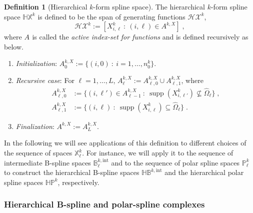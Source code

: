 \documentclass[10pt]{article}
\DeclareMathOperator{\supp}{supp}
\newcommand{\basis}[1]{\mathcal{#1}}
\newcommand{\vSpace}[1]{\mathbb{#1}}
\newcommand{\tpDomain}{\widehat{\Omega}}
\newcommand{\bsp}{B}
\newcommand{\bspS}{\vSpace{\bsp}}
\newcommand{\polar}{P}
\newcommand{\polarS}{\vSpace{\polar}}
\newcommand{\tint}{\mathrm{int}}
\newcommand{\hSpace}[1]{\mathit{\vSpace{H}\vSpace{#1}}}
\newcommand{\hBasis}[1]{\mathit{\basis{H}\basis{#1}}}
\newcommand{\activeS}[2]{A^{#1}_{#2}}
\theoremstyle{plain}
\theoremstyle{definition}
\newtheorem{definition}{Definition}[section]
\theoremstyle{remark}
\begin{document}
\begin{definition}[Hierarchical $k$-form spline space]
    The hierarchical $k$-form spline space $\hSpace{X}^k$ is defined to be the span of generating functions $\hBasis{X}^k$,
    \begin{equation}
        \hBasis{X}^k := \left[
            X_{i,\ell}^k~:~(i,\ell) \in \activeS{k,X}{}
        \right]\;,
    \end{equation}
    where $\activeS{}{}$ is called the \emph{active index-set for functions} and is defined recursively as below.
    \begin{enumerate}
        \item \emph{Initialization}: $\activeS{k,X}{0} := \{(i,0)~:~i = 1, \dots, n^k_0\}$.
        \item \emph{Recursive case}: For $\ell = 1,\dots,L$, $\activeS{k,X}{\ell} := \activeS{k,X}{\ell,0} \cup \activeS{k,X}{\ell,1}$, where
            \begin{equation}
                \begin{split}
                    \activeS{k,X}{\ell,0} &:= \{(i,\ell') \in \activeS{k,X}{\ell-1}~:~ \supp(X^k_{i,\ell'}) \not\subseteq \tpDomain_{\ell}\}\;,\\
                    \activeS{k,X}{\ell,1} &:= \{(i,\ell)~:~ \supp(X^k_{i,\ell}) \subseteq \tpDomain_{\ell}\}\;.
                \end{split}
            \end{equation}
        \item \emph{Finalization}: $\activeS{k,X}{} := \activeS{k,X}{L}$.
    \end{enumerate}
\end{definition}
In the following we will see applications of this definition to different choices of the sequence of spaces $\vSpace{X}^k_\ell$.
For instance, we will apply it to the sequence of intermediate B-spline spaces $\bspS^{k,\tint}_\ell$ and to the sequence of polar spline spaces $\polarS^k_\ell$ to construct the hierarchical B-spline spaces $\hSpace{\bsp}^{k,\tint}$ and the hierarchical polar spline spaces $\hSpace{\polar}^k$, respectively.

\subsubsection{Hierarchical B-spline and polar-spline complexes}
\label{sec:construction-hierarchical-specific}
\end{document}
